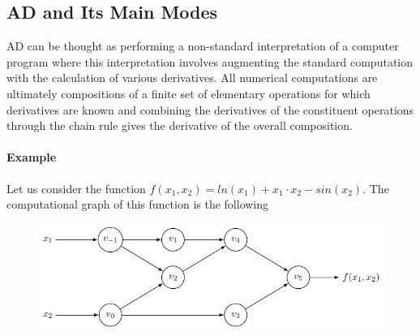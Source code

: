 \subsection{AD and Its Main Modes}
AD can be thought as performing a non-standard interpretation of a computer program where this interpretation involves augmenting the standard computation with the calculation of various derivatives. All numerical computations are ultimately compositions of a finite set of elementary operations for which derivatives are known and combining the derivatives of the constituent operations through the chain rule gives the derivative of the overall composition.

\paragraph{Example} Let us consider the function $f(x_1,x_2)= ln(x_1)+ x_1 \cdot x_2 -sin(x_2)$. The computational graph of this function is the following

\begin{figure}[h!]
	\centering
	\includegraphics[scale=0.9]{img/compGraph}
\end{figure}